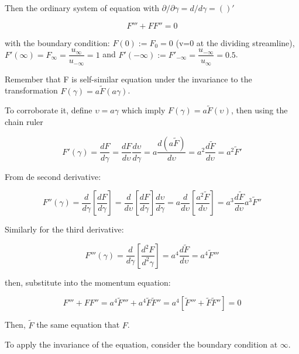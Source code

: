Then the ordinary system of equation with 
$\partial /\partial  \gamma=d/d \gamma=()'$ 

\begin{equation} 
F'''
+
F
F''
=0
\end{equation} 

with the boundary condition:
$F(0):=F_0=0$ (v=0 at the dividing streamline), $F'(\infty)=F_\infty=\dfrac{u_{\infty}}{u_{-\infty}}=1$ and  $F'(-\infty):=F'_{-\infty}=\dfrac{u_{-\infty}}{u_{\infty}}=0.5$.

Remember that F is self-similar equation under the invariance to the transformation $F(\gamma)=a\tilde{F}(a\gamma)$. 

To corroborate it, define $\upsilon=a\gamma$ which imply
$ 
F(\gamma)=a\tilde{F}(\upsilon)$,
then using the chain ruler  

\begin{equation*}
F'(\gamma)= 
\frac{d F}{ d\gamma }
=
\frac{d F}{ d\upsilon }
\frac{d\upsilon }{d\gamma}
=
a
\frac{d (a\tilde{F})}{ d\upsilon }
=
a^2
\frac{d \tilde{F}}{ d\upsilon }
=
a^2
\tilde{F}'
\end{equation*}

From de second derivative:

\begin{equation*}
F''(\gamma)= 
\frac{d }{ d\gamma }
\left[
\frac{d F}{ d\gamma }
\right]
=
\frac{d }{ d\upsilon }
\left[
\frac{d F}{ d\gamma }
\right]
\frac{d\upsilon }{d\gamma}
=
a
\frac{d }{ d\upsilon }
\left[
\frac{a^2
\tilde{F}}{ d\upsilon }
\right]
=
a^3
\frac{d \tilde{F}}{ d\upsilon }
a^3
\tilde{F}''
\end{equation*}

Similarly for the third derivative:

\begin{equation*}
F'''(\gamma)= 
\frac{d }{ d\gamma }
\left[
\frac{d^2 F}{ d^2\gamma }
\right]
=
a^4
\frac{d \tilde{F}}{ d\upsilon }
=
a^4
\tilde{F}'''
\end{equation*}

then, substitute into the momentum equation:

\begin{equation} 
F'''
+
F
F''
=
a^4
\tilde{F}'''
+
a^4
\tilde{F}
\tilde{F}''
=
a^4
[
\tilde{F}'''
+
\tilde{F}
\tilde{F}''
]
=
0
\end{equation} 

Then, $\tilde{F}$ the same equation that $F$.

To apply the invariance of the equation, consider the boundary condition at $\infty$.

